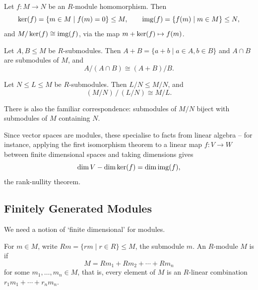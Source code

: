 \documentclass[a4paper]{scrartcl}
\begin{document}
\begin{theorem}
	Let $f: M \rightarrow N$ be an $R$-module homomorphism. Then
	$$
	\operatorname{ker} (f) = \{m \in M \mid f(m) = 0\} \leq M, \qquad \operatorname{img}(f) = \{f(m) \mid m \in M\} \leq N,
	$$
	and $M/\operatorname{ker}(f) \cong \operatorname{img}(f)$, via the map $m + \operatorname{ker}(f) \mapsto f(m)$.
\end{theorem}

\begin{center}
\end{center}

\begin{theorem}
	Let $A, B \leq M$ be $R$-submodules. Then $A + B = \{a + b \mid a \in A, b \in B\}$ and $A \cap B$ are submodules of $M$, and
	$$
	A/(A \cap B) \cong (A + B)/B.
	$$
\end{theorem}

\begin{theorem}
	Let $N \leq L \leq M$ be $R$-submodules. Then $L/N \leq M/N$, and
	$$
	(M/N) \,/\, (L/N) \cong M/L.
	$$
\end{theorem}

There is also the familiar correspondence: submodules of $M/N$ biject with submodules of $M$ containing $N$.

\begin{remark}
	Since vector spaces are modules, these specialise to facts from linear algebra -- for instance, applying the first isomorphism theorem to a linear map $f: V \rightarrow W$ between finite dimensional spaces and taking dimensions gives
	$$
	\dim V - \dim \operatorname{ker}(f) = \dim \operatorname{img}(f),
	$$
	the rank-nullity theorem.
\end{remark}

\subsection{Finitely Generated Modules}

We need a notion of `finite dimensional' for modules.

\begin{definition}[Generation]
	For $m \in M$, write $Rm = \{rm \mid r \in R\} \leq M$, the submodule  $m$. An $R$-module $M$ is  if
	$$
	M = Rm_1 + Rm_2 + \cdots + Rm_n
	$$
	for some $m_1, \dots, m_n \in M$, that is, every element of $M$ is an $R$-linear combination $r_1 m_1 + \cdots + r_n m_n$.
\end{definition}
\end{document}
